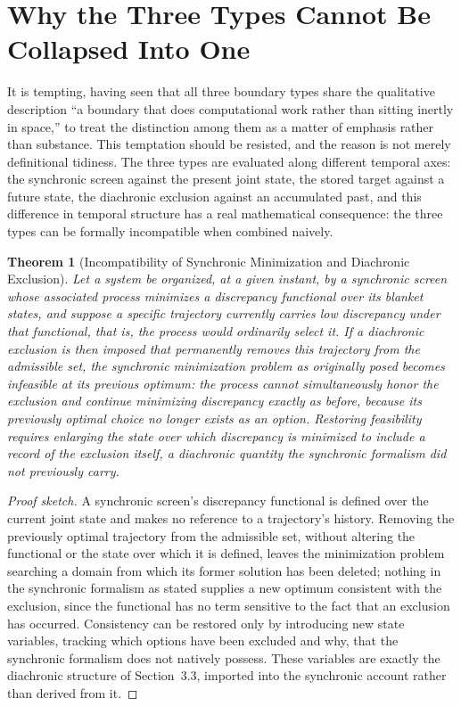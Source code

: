 \documentclass[11pt,fleqn]{book}
\numberwithin{equation}{chapter}
\theoremstyle{plain}
\newtheorem{theorem}{Theorem}[chapter]
\theoremstyle{definition}
\theoremstyle{remark}
\providecommand{\enquote}[1]{``#1''}
\begin{document}
\section{Why the Three Types Cannot Be Collapsed Into One}

It is tempting, having seen that all three boundary types share the qualitative description \enquote{a boundary that does computational work rather than sitting inertly in space,} to treat the distinction among them as a matter of emphasis rather than substance. This temptation should be resisted, and the reason is not merely definitional tidiness. The three types are evaluated along different temporal axes: the synchronic screen against the present joint state, the stored target against a future state, the diachronic exclusion against an accumulated past, and this difference in temporal structure has a real mathematical consequence: the three types can be formally incompatible when combined naively.

\begin{theorem}[Incompatibility of Synchronic Minimization and Diachronic Exclusion]
Let a system be organized, at a given instant, by a synchronic screen whose associated process minimizes a discrepancy functional over its blanket states, and suppose a specific trajectory currently carries low discrepancy under that functional, that is, the process would ordinarily select it. If a diachronic exclusion is then imposed that permanently removes this trajectory from the admissible set, the synchronic minimization problem as originally posed becomes infeasible at its previous optimum: the process cannot simultaneously honor the exclusion and continue minimizing discrepancy exactly as before, because its previously optimal choice no longer exists as an option. Restoring feasibility requires enlarging the state over which discrepancy is minimized to include a record of the exclusion itself, a diachronic quantity the synchronic formalism did not previously carry.
\end{theorem}

\begin{proof}[Proof sketch]
A synchronic screen's discrepancy functional is defined over the current joint state and makes no reference to a trajectory's history. Removing the previously optimal trajectory from the admissible set, without altering the functional or the state over which it is defined, leaves the minimization problem searching a domain from which its former solution has been deleted; nothing in the synchronic formalism as stated supplies a new optimum consistent with the exclusion, since the functional has no term sensitive to the fact that an exclusion has occurred. Consistency can be restored only by introducing new state variables, tracking which options have been excluded and why, that the synchronic formalism does not natively possess. These variables are exactly the diachronic structure of Section~3.3, imported into the synchronic account rather than derived from it.
\end{proof}
\end{document}
